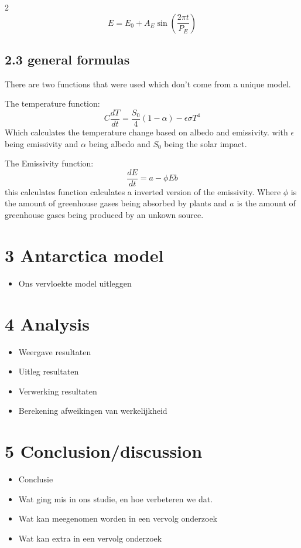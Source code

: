 \documentclass[
]{article}
\begin{document}
\begin{multicols}{2}
\[E = E_{0} + A_{E}\sin\left( \frac{2\pi t}{P_{E}} \right)\]

\subsection{2.3 general formulas} %
There are two functions that were used which don't come from a unique model.

The temperature function:
\[C\frac{dT}{dt} = \frac{S_{0}}{4}(1 - \alpha) - \epsilon\sigma T^{4}\]
Which calculates the temperature change based on albedo and emissivity. with $\epsilon$ being emissivity and $\alpha$ being albedo and $S_{0}$ being the solar impact.

The Emissivity function:
\[\frac{dE}{dt} = a - \phi Eb\] %
this calculates function calculates a inverted version of the emissivity. Where $\phi$ is the amount of greenhouse gases being absorbed by plants and $a$ is the amount of greenhouse gases being produced by an unkown source.

\section{3 Antarctica model}

\begin{itemize}
\item
  Ons vervloekte model uitleggen
\end{itemize}

\section{4 Analysis} %

\begin{itemize}
\item
  Weergave resultaten
\item
  Uitleg resultaten
\item
  Verwerking resultaten
\item
  Berekening afweikingen van werkelijkheid
\end{itemize}

\section{5 Conclusion/discussion} %

\begin{itemize}
\item
  Conclusie
\item
  Wat ging mis in ons studie, en hoe verbeteren we dat.
\item
  Wat kan meegenomen worden in een vervolg onderzoek
\item
  Wat kan extra in een vervolg onderzoek
\end{itemize}
\end{multicols}
\end{document}

